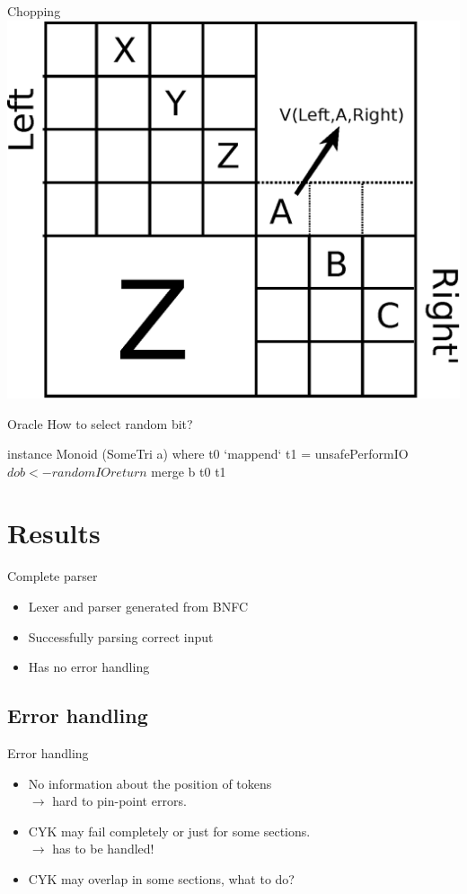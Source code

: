 \documentclass{beamer}
\begin{document}
\begin{frame}{Chopping}
    \centering
    \includegraphics[width=.5\textwidth]{merge-with-chopping.eps}
\end{frame}

\begin{frame}[fragile]{Oracle}
How to select random bit?
\begin{code}
instance Monoid (SomeTri a) where
    t0 `mappend` t1 = unsafePerformIO $ do
        b <- randomIO
        return $ merge b t0 t1
\end{code}
\end{frame}

\section{Results}
\begin{frame}{Complete parser}
    \begin{itemize}
        \item Lexer and parser generated from BNFC
        \item Successfully parsing correct input
        \item Has no error handling
    \end{itemize}
\end{frame}

\subsection{Error handling}
\begin{frame}{Error handling}
    \begin{itemize}
        \item No information about the position of tokens \\ $\rightarrow$ hard to pin-point errors.
        \pause
        \item CYK may fail completely or just for some sections. \\ $\rightarrow$ has to be handled!
        \item CYK may overlap in some sections, what to do?
    \end{itemize}
\end{frame}
\end{document}
